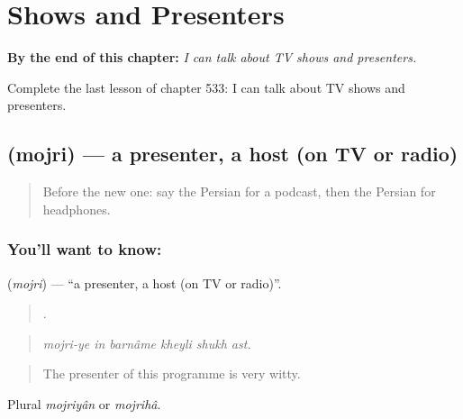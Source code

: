 
\chapter{Shows and Presenters}
\label{ch:fa-shows-and-presenters}

\begin{chapteropening}
\textbf{By the end of this chapter:} \emph{I can talk about TV shows and presenters.}

Complete the last lesson of chapter 533: I can talk about TV shows and presenters.
\end{chapteropening}

\section[\texorpdfstring{\fa{مجری} (mojri)}{مجری (mojri)}]{ (mojri) — a presenter, a host (on TV or radio)}

\label{lesson:FA-C533-mojri}



\begin{quote}
Before the new one: say the Persian for a podcast, then the Persian for headphones.
\end{quote}

\subsection*{You'll want to know: }
\textbf{} (\emph{mojri}) — \textquotedblleft{}a presenter, a host (on TV or radio)\textquotedblright{}.

\begin{quote}
     .
\end{quote}

\begin{quote}
\emph{mojri-ye in barnâme kheyli shukh ast.}
\end{quote}

\begin{quote}
The presenter of this programme is very witty.
\end{quote}

Plural \emph{mojriyân} or \emph{mojrihâ}.

